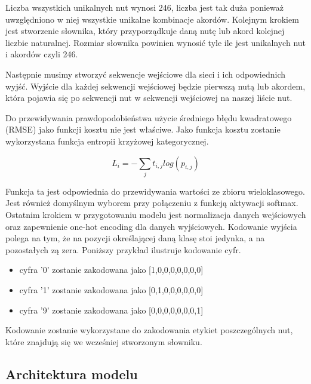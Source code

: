 Liczba wszystkich unikalnych nut wynosi 246, liczba jest tak duża ponieważ uwzględniono w niej wszystkie unikalne kombinacje akordów. Kolejnym krokiem jest stworzenie słownika, który przyporządkuje daną nutę lub akord kolejnej liczbie naturalnej. Rozmiar słownika powinien wynosić tyle ile jest unikalnych nut i akordów czyli 246.

Następnie musimy stworzyć sekwencje wejściowe dla sieci i ich odpowiednich wyjść. Wyjście dla każdej sekwencji wejściowej będzie pierwszą nutą lub akordem, która pojawia się po sekwencji nut w sekwencji wejściowej na naszej liście nut.



Do przewidywania prawdopodobieństwa użycie średniego błędu kwadratowego (RMSE) jako funkcji kosztu nie jest właściwe. Jako funkcja kosztu zostanie wykorzystana funkcja entropii krzyżowej kategorycznej. 

\begin{equation}
	L_{i} = - \sum_{j}t_{i,j} log(p_{i,j})
\end{equation}

Funkcja ta jest odpowiednia do przewidywania wartości ze zbioru wieloklasowego. Jest również domyślnym wyborem przy połączeniu z funkcją aktywacji softmax. Ostatnim krokiem w przygotowaniu modelu jest normalizacja danych wejściowych oraz zapewnienie one-hot encoding dla danych wyjściowych. Kodowanie wyjścia polega na tym, że na pozycji określającej daną klasę stoi jedynka, a na pozostałych zą zera. Poniższy przykład ilustruje kodowanie cyfr. 

\begin{itemize}
	\item cyfra '0' zostanie zakodowana jako [1,0,0,0,0,0,0,0]
	\item cyfra '1' zostanie zakodowana jako [0,1,0,0,0,0,0,0]
	\item cyfra '9' zostanie zakodowana jako [0,0,0,0,0,0,0,1]
\end{itemize}

Kodowanie zostanie wykorzystane do zakodowania etykiet poszczególnych nut, które znajdują się we wcześniej stworzonym słowniku. 

\subsection{Architektura modelu}
